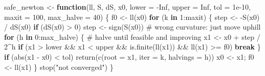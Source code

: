 \documentclass[
  letterpaper,
  DIV=11,
  numbers=noendperiod]{scrreprt}
\newenvironment{Shaded}{\begin{snugshade}}{\end{snugshade}}
\newcommand{\AttributeTok}[1]{\textcolor[rgb]{0.40,0.45,0.13}{#1}}
\newcommand{\CommentTok}[1]{\textcolor[rgb]{0.37,0.37,0.37}{#1}}
\newcommand{\ConstantTok}[1]{\textcolor[rgb]{0.56,0.35,0.01}{#1}}
\newcommand{\ControlFlowTok}[1]{\textcolor[rgb]{0.00,0.23,0.31}{\textbf{#1}}}
\newcommand{\DecValTok}[1]{\textcolor[rgb]{0.68,0.00,0.00}{#1}}
\newcommand{\FloatTok}[1]{\textcolor[rgb]{0.68,0.00,0.00}{#1}}
\newcommand{\FunctionTok}[1]{\textcolor[rgb]{0.28,0.35,0.67}{#1}}
\newcommand{\NormalTok}[1]{\textcolor[rgb]{0.00,0.23,0.31}{#1}}
\newcommand{\OtherTok}[1]{\textcolor[rgb]{0.00,0.23,0.31}{#1}}
\newcommand{\SpecialCharTok}[1]{\textcolor[rgb]{0.37,0.37,0.37}{#1}}
\newcommand{\StringTok}[1]{\textcolor[rgb]{0.13,0.47,0.30}{#1}}
\begin{document}
\begin{Shaded}
\begin{Highlighting}[]
\NormalTok{safe\_newton }\OtherTok{\textless{}{-}} \ControlFlowTok{function}\NormalTok{(ll, S, dS, x0, }\AttributeTok{lower =} \SpecialCharTok{{-}}\ConstantTok{Inf}\NormalTok{, }\AttributeTok{upper =} \ConstantTok{Inf}\NormalTok{,}
                        \AttributeTok{tol =} \FloatTok{1e{-}10}\NormalTok{, }\AttributeTok{maxit =} \DecValTok{100}\NormalTok{, }\AttributeTok{max\_halve =} \DecValTok{40}\NormalTok{) \{}
\NormalTok{  f0 }\OtherTok{\textless{}{-}} \FunctionTok{ll}\NormalTok{(x0)}
  \ControlFlowTok{for}\NormalTok{ (k }\ControlFlowTok{in} \DecValTok{1}\SpecialCharTok{:}\NormalTok{maxit) \{}
\NormalTok{    step }\OtherTok{\textless{}{-}} \SpecialCharTok{{-}}\FunctionTok{S}\NormalTok{(x0) }\SpecialCharTok{/} \FunctionTok{dS}\NormalTok{(x0)}
    \ControlFlowTok{if}\NormalTok{ (}\FunctionTok{dS}\NormalTok{(x0) }\SpecialCharTok{\textgreater{}} \DecValTok{0}\NormalTok{) step }\OtherTok{\textless{}{-}} \FunctionTok{sign}\NormalTok{(}\FunctionTok{S}\NormalTok{(x0))          }\CommentTok{\# wrong curvature: just move uphill}
    \ControlFlowTok{for}\NormalTok{ (h }\ControlFlowTok{in} \DecValTok{0}\SpecialCharTok{:}\NormalTok{max\_halve) \{                     }\CommentTok{\# halve until feasible and improving}
\NormalTok{      x1 }\OtherTok{\textless{}{-}}\NormalTok{ x0 }\SpecialCharTok{+}\NormalTok{ step }\SpecialCharTok{/} \DecValTok{2}\SpecialCharTok{\^{}}\NormalTok{h}
      \ControlFlowTok{if}\NormalTok{ (x1 }\SpecialCharTok{\textgreater{}}\NormalTok{ lower }\SpecialCharTok{\&\&}\NormalTok{ x1 }\SpecialCharTok{\textless{}}\NormalTok{ upper }\SpecialCharTok{\&\&} \FunctionTok{is.finite}\NormalTok{(}\FunctionTok{ll}\NormalTok{(x1)) }\SpecialCharTok{\&\&} \FunctionTok{ll}\NormalTok{(x1) }\SpecialCharTok{\textgreater{}=}\NormalTok{ f0) }\ControlFlowTok{break}
\NormalTok{    \}}
    \ControlFlowTok{if}\NormalTok{ (}\FunctionTok{abs}\NormalTok{(x1 }\SpecialCharTok{{-}}\NormalTok{ x0) }\SpecialCharTok{\textless{}}\NormalTok{ tol) }\FunctionTok{return}\NormalTok{(}\FunctionTok{c}\NormalTok{(}\AttributeTok{root =}\NormalTok{ x1, }\AttributeTok{iter =}\NormalTok{ k, }\AttributeTok{halvings =}\NormalTok{ h))}
\NormalTok{    x0 }\OtherTok{\textless{}{-}}\NormalTok{ x1; f0 }\OtherTok{\textless{}{-}} \FunctionTok{ll}\NormalTok{(x1)}
\NormalTok{  \}}
  \FunctionTok{stop}\NormalTok{(}\StringTok{"not converged"}\NormalTok{)}
\NormalTok{\}}
\end{Highlighting}
\end{Shaded}
\end{document}
